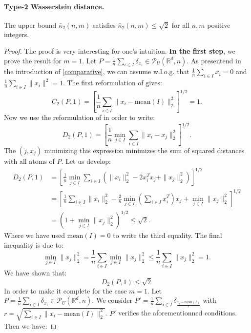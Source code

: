 \documentclass{amsart}
\newcommand{\RR}{\mathbb{R}}
\begin{document}
\paragraph{\textbf{Type-2 Wasserstein distance.}}
\begin{proposition}
    The upper bound $\bar\kappa_2\left(n,m\right)$ satisfies $\bar\kappa_2\left(n,m\right)\leq \sqrt{2}$ for all $n, m$ positive integers.
\end{proposition}
\begin{proof} 
    The proof is very interesting for one's intuition. \textbf{In the first step}, we prove the result for $m=1$. Let $P=\frac{1}{n}\sum_{i\in I}\delta_{x_i}\in\mathcal{P}_U\left(\RR^d,n\right)$. As presentend in the introduction of \ref{comparative}, we can assume w.l.o.g. that $\frac{1}{n}\sum_{i\in I}x_i=0$ and $\frac{1}{n}\sum_{i\in I}\lVert x_i\rVert^2=1$.
    \newline
    The first reformulation of  gives:
    $$
    C_2\left(P,1\right)=\left[\frac{1}{n}\sum_{i\in I}\lVert x_i-\text{mean}(I)\rVert_2^2\right]^{1/2}=1.
    $$
    Now we use the reformulation of  in order to write:
    $$
    D_2\left(P,1\right)=\left[\frac{1}{n}\min_{j\in I}\sum_{i\in I}\lVert x_i-x_j\rVert^2_2\right]^{1/2}.
    $$
    The $\left(j, x_j\right)$ minimizing this expression minimizes the sum of squared distances with all atoms of $P$. Let us develop:
    \begin{align*}
    D_2\left(P,1\right)&=\left[\frac{1}{n}\min_{j\in I}\sum_{i\in I}\left(\rVert x_i\rVert^2_2-2x_i^Tx_j+\rVert x_j\rVert^2_2\right)\right]^{1/2}\\&=\left[\frac{1}{n}\sum_{i\in I}\lVert x_i\rVert_2^2-\frac{2}{n}\min_{j\in I}\left(\sum_{i\in I}x_i^T\right)x_j+\min_{j\in I}\lVert x_j\rVert^2_2\right]^{1/2} \\&=\left(1+\min_{j\in I}\lVert x_j\rVert^2_2\right)^{1/2}\leq\sqrt{2}.
    \end{align*}
Where we have used $\text{mean}(I)=0$ to write the third equality. The final inequality is due to: $$\min_{j\in I}\lVert x_j\rVert^2_2=\frac{1}{n}\sum_{i\in I}\min_{j\in I}\lVert x_j\rVert^2_2\leq \frac{1}{n}\sum_{i\in I}\lVert x_j\rVert^2_2=1.$$ \noindent We have shown that: $$D_2\left(P,1\right)\leq\sqrt{2}$$
In order to make it complete for the case $m=1$. Let $P=\frac{1}{n}\sum_{i\in I}\delta_{x_i}\in\mathcal{P}_U\left(\RR^d,n\right)$. We consider $P'=\frac{1}{n}\sum_{i\in I}\delta_{\frac{x_i-\text{mean}(I)}{r}}$ with $r=\sqrt{\sum_{i\in I}\rVert x_i-\text{mean}(I)\lVert^2_2}$. $P'$ verifies the aforementionned conditions. Then we have: 

\end{proof}
\end{document}
